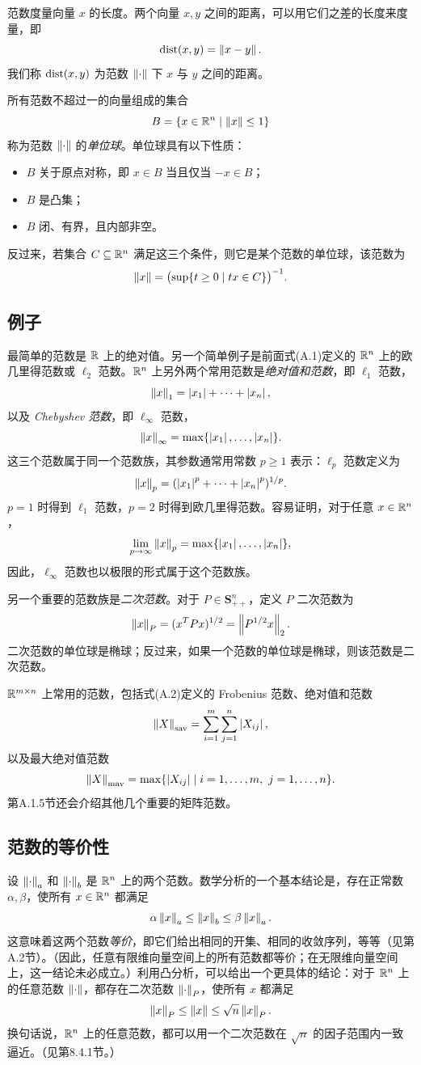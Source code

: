 范数度量向量 $x$ 的长度。两个向量 $x,y$ 之间的距离，可以用它们之差的长度来度量，即
\[
 \operatorname{dist}(x,y)=\left\lVert x-y\right\rVert.
\]
我们称 $\operatorname{dist}(x,y)$ 为范数 $\left\lVert \cdot\right\rVert$ 下 $x$ 与 $y$ 之间的距离。

所有范数不超过一的向量组成的集合
\[
 B=\{x\in\mathbb R^n\mid\left\lVert x\right\rVert\leq1\}
\]
称为范数 $\left\lVert \cdot\right\rVert$ 的\emph{单位球}。单位球具有以下性质：
\begin{itemize}
\item $B$ 关于原点对称，即 $x\in B$ 当且仅当 $-x\in B$；
\item $B$ 是凸集；
\item $B$ 闭、有界，且内部非空。
\end{itemize}
反过来，若集合 $C\subseteq\mathbb R^n$ 满足这三个条件，则它是某个范数的单位球，该范数为
\[
 \left\lVert x\right\rVert=\bigl(\sup\{t\geq0\mid tx\in C\}\bigr)^{-1}.
\]

\subsection{例子}
最简单的范数是 $\mathbb R$ 上的绝对值。另一个简单例子是前面式(A.1)定义的 $\mathbb R^n$ 上的欧几里得范数或 $\ell_2$ 范数。$\mathbb R^n$ 上另外两个常用范数是\emph{绝对值和范数}，即 $\ell_1$ 范数，
\[
 \left\lVert x\right\rVert_1=\left\lvert x_1\right\rvert+\cdots+\left\lvert x_n\right\rvert,
\]
以及 \emph{Chebyshev 范数}，即 $\ell_\infty$ 范数，
\[
 \left\lVert x\right\rVert_\infty=\max\{\left\lvert x_1\right\rvert,\ldots,\left\lvert x_n\right\rvert\}.
\]
这三个范数属于同一个范数族，其参数通常用常数 $p\geq1$ 表示：$\ell_p$ 范数定义为
\[
 \left\lVert x\right\rVert_p=(\left\lvert x_1\right\rvert^p+\cdots+\left\lvert x_n\right\rvert^p)^{1/p}.
\]
$p=1$ 时得到 $\ell_1$ 范数，$p=2$ 时得到欧几里得范数。容易证明，对于任意 $x\in\mathbb R^n$，
\[
 \lim_{p\to\infty}\left\lVert x\right\rVert_p=\max\{\left\lvert x_1\right\rvert,\ldots,\left\lvert x_n\right\rvert\},
\]
因此，$\ell_\infty$ 范数也以极限的形式属于这个范数族。

另一个重要的范数族是\emph{二次范数}。对于 $P\in\mathbf S_{++}^n$，定义 $P$ 二次范数为
\[
 \left\lVert x\right\rVert_P=(x^TPx)^{1/2}=\left\lVert P^{1/2}x\right\rVert_2.
\]
二次范数的单位球是椭球；反过来，如果一个范数的单位球是椭球，则该范数是二次范数。

$\mathbb R^{m\times n}$ 上常用的范数，包括式(A.2)定义的 Frobenius 范数、绝对值和范数
\[
 \left\lVert X\right\rVert_{\mathrm{sav}}=\sum_{i=1}^m\sum_{j=1}^n\left\lvert X_{ij}\right\rvert,
\]
以及最大绝对值范数
\[
 \left\lVert X\right\rVert_{\mathrm{mav}}=\max\{\left\lvert X_{ij}\right\rvert\mid i=1,\ldots,m,\ j=1,\ldots,n\}.
\]
第A.1.5节还会介绍其他几个重要的矩阵范数。

\subsection{范数的等价性}
设 $\left\lVert \cdot\right\rVert_a$ 和 $\left\lVert \cdot\right\rVert_b$ 是 $\mathbb R^n$ 上的两个范数。数学分析的一个基本结论是，存在正常数 $\alpha,\beta$，使所有 $x\in\mathbb R^n$ 都满足
\[
 \alpha\left\lVert x\right\rVert_a\leq\left\lVert x\right\rVert_b\leq\beta\left\lVert x\right\rVert_a.
\]
这意味着这两个范数\emph{等价}，即它们给出相同的开集、相同的收敛序列，等等（见第A.2节）。（因此，任意有限维向量空间上的所有范数都等价；在无限维向量空间上，这一结论未必成立。）利用凸分析，可以给出一个更具体的结论：对于 $\mathbb R^n$ 上的任意范数 $\left\lVert \cdot\right\rVert$，都存在二次范数 $\left\lVert \cdot\right\rVert_P$，使所有 $x$ 都满足
\[
 \left\lVert x\right\rVert_P\leq\left\lVert x\right\rVert\leq\sqrt n\left\lVert x\right\rVert_P.
\]
换句话说，$\mathbb R^n$ 上的任意范数，都可以用一个二次范数在 $\sqrt n$ 的因子范围内一致逼近。（见第8.4.1节。）

